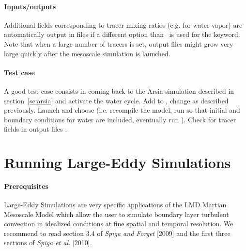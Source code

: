 \paragraph{Inputs/outputs} Additional fields corresponding to tracer mixing ratios (e.g.  for water vapor) are automatically output in  files if a different option than~ is used for the  keyword. Note that when a large number of tracers is set, output files might grow very large quickly after the mesoscale simulation is launched.

\paragraph{Test case} A good test case consists in coming back to the Arsia simulation described in section~\ref{sc:arsia} and activate the water cycle. Add  to , change  as described previously. Launch  and choose  (i.e. recompile the model, run  so that initial and boundary conditions for water are included, eventually run ). Check for tracer fields in output files . 

\mk
\section{Running Large-Eddy Simulations}

\paragraph{Prerequisites} Large-Eddy Simulations are very specific applications of the LMD Martian Meso\-scale Model which allow the user to simulate boundary layer turbulent convection in idealized conditions at fine spatial and temporal resolution. We recommend to read section 3.4 of \textit{Spiga and Forget} [2009] and the first three sections of \textit{Spiga et al.} [2010]\nocite{Spig:10bl}.


